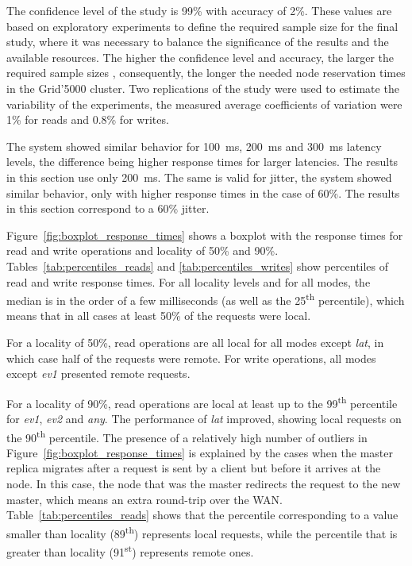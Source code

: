 \documentclass[man,floatsintext,12pt]{apa6}
\begin{document}
The confidence level of the study is 99\% with accuracy of 2\%. These values
are based on exploratory experiments to define the required sample size for the
final study, where it was necessary to balance the significance of the results
and the available resources. The higher the confidence level and accuracy, the
larger the required sample sizes \parencite{Jain1991}, consequently, the longer
the needed node reservation times in the Grid'5000 cluster. Two replications of
the study were used to estimate the variability of the experiments, the
measured average coefficients of variation were 1\% for reads and 0.8\% for
writes.

The system showed similar behavior for 100~ms, 200~ms and 300~ms latency
levels, the difference being higher response times for larger latencies. The
results in this section use only 200~ms. The same is valid for jitter, the
system showed similar behavior, only with higher response times in the case of
60\%. The results in this section correspond to a 60\% jitter.

Figure~\ref{fig:boxplot_response_times} shows a boxplot with the response times
for read and write operations and locality of 50\% and 90\%.
Tables~\ref{tab:percentiles_reads} and \ref{tab:percentiles_writes} show
percentiles of read and write response times. For all locality levels and for
all modes, the median is in the order of a few milliseconds (as well as the
25\textsuperscript{th} percentile), which means that in all cases at least 50\%
of the requests were local.

For a locality of 50\%, read operations are all local for all modes except
\textit{lat}, in which case half of the requests were remote. For write
operations, all modes except \textit{ev1} presented remote requests. 

For a locality of 90\%, read operations are local at least up to the
99\textsuperscript{th} percentile for \textit{ev1}, \textit{ev2} and
\textit{any}. The performance of \textit{lat} improved, showing local requests
on the 90\textsuperscript{th} percentile. The presence of a relatively high
number of outliers in Figure~\ref{fig:boxplot_response_times} is explained by
the cases when the master replica migrates after a request is sent by a client
but before it arrives at the node. In this case, the node that was the master
redirects the request to the new master, which means an extra round-trip over
the WAN. Table~\ref{tab:percentiles_reads} shows that the percentile
corresponding to a value smaller than locality (89\textsuperscript{th})
represents local requests, while the percentile that is greater than locality
(91\textsuperscript{st}) represents remote ones.
\end{document}
